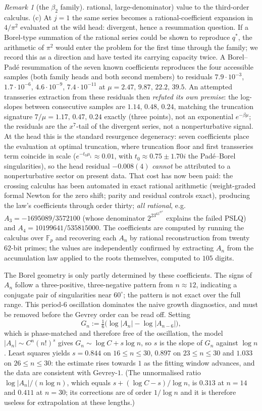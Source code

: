 \documentclass[11pt]{article}
\theoremstyle{plain}
\theoremstyle{definition}
\theoremstyle{remark}
\newtheorem{remark}[theorem]{Remark}
\newcommand{\F}{\mathbb{F}}
\begin{document}
\begin{remark}[the $\beta_2$ family]
rational, large-denominator) value to the third-order calculus. (c) At $j=1$ the same series
becomes a rational-coefficient expansion in $4/\pi^2$ evaluated at the wild head: divergent, hence
a resummation question. If a Borel-type summation of the rational series could be shown to
reproduce $q^\ast$, the arithmetic of $\pi^2$ would enter the problem for the first time through
the family; we record this as a direction and have tested its carrying capacity twice. A Borel--Pad\'e
resummation of the seven known coefficients reproduces the four accessible samples (both family
heads and both second members) to residuals $7.9\cdot10^{-3}$, $1.7\cdot10^{-6}$,
$4.6\cdot10^{-9}$, $7.4\cdot10^{-11}$ at $\mu=2.47,\,9.87,\,22.2,\,39.5$. An attempted
transseries extraction from these residuals then \emph{refuted its own premise}: the log-slopes
between consecutive samples are $1.14,\,0.48,\,0.24$, matching the truncation signature $7/\mu
=1.17,\,0.47,\,0.24$ exactly (three points), not an exponential $e^{-\beta\mu}$; the
residuals are the $x^7$-tail of the divergent series, not a nonperturbative signal. At the head
this is the standard resurgence degeneracy: seven coefficients place the evaluation at optimal
truncation, where truncation floor and first transseries term coincide in scale
($e^{-t_0\mu_1}\approx0.01$, with $t_0\approx0.75\pm1.70i$ the Pad\'e--Borel singularities),
so the head residual $-0.008(4)$ \emph{cannot} be attributed to a nonperturbative sector on
present data. That cost has now been paid: the crossing calculus has been automated in exact rational
arithmetic (weight-graded formal Newton for the zero shift; parity and residual controls exact),
producing the law's coefficients through order thirty; \emph{all rational}, e.g.\
$A_3=-1695089/3572100$ (whose denominator $2^23^65^27^2$ explains the failed PSLQ) and
$A_4=10199641/535815000$. The coefficients are computed by running the calculus over $\F_p$ and
recovering each $A_n$ by rational reconstruction from twenty $62$-bit primes; the values are
independently confirmed by extracting $A_n$ from the accumulation law applied to the roots
themselves, computed to $105$ digits.

The Borel geometry is only partly determined by these coefficients. The signs of $A_n$ follow a
three-positive, three-negative pattern from $n\approx12$, indicating a conjugate pair of
singularities near $60^\circ$; the pattern is not exact over the full range. This period-$6$
oscillation dominates the naive growth diagnostics, and must be removed before the Gevrey order can
be read off. Setting
\[
   G_n:=\tfrac16\bigl(\log|A_n|-\log|A_{n-6}|\bigr),
\]
which is phase-matched and therefore free of the oscillation, the model $|A_n|\sim C^n(n!)^s$ gives
$G_n\sim\log C+s\log n$, so $s$ is the slope of $G_n$ against $\log n$. Least squares yields
$s=0.844$ on $16\le n\le30$, $0.897$ on $23\le n\le30$ and $1.033$ on $26\le n\le30$: the estimate
rises towards $1$ as the fitting window advances, and the data are consistent with Gevrey-$1$.
(The unnormalised ratio $\log|A_n|/(n\log n)$, which equals $s+(\log C-s)/\log n$, is $0.313$ at
$n=14$ and $0.411$ at $n=30$; its corrections are of order $1/\log n$ and it is therefore useless
for extrapolation at these lengths.)


\end{remark}
\end{document}
